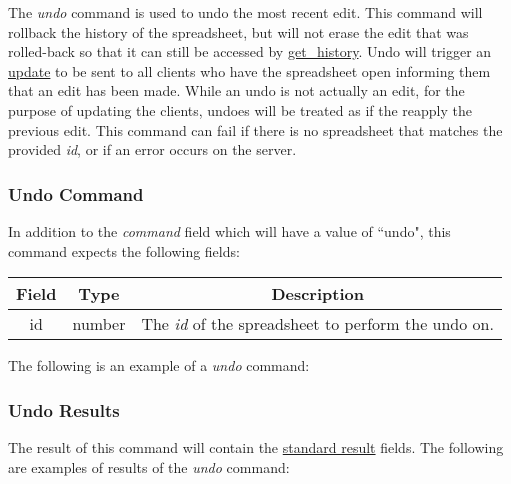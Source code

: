 The \emph{undo} command is used to undo the most recent edit. This command 
will rollback the history of the spreadsheet, but will not erase the edit 
that was rolled-back so that it can still be accessed by \hyperref[sec:message:get_history]{get\_history}. 
Undo will trigger an \hyperref[lst:update:edits]{update} to be sent to all 
clients who have the spreadsheet open informing them that an edit has been 
made. While an undo is not actually an edit, for the purpose of updating 
the clients, undoes will be treated as if the reapply the previous edit. 
This command can fail if there is no spreadsheet that matches the provided \emph{id}, 
or if an error occurs on the server.

\subsubsection{Undo Command}
In addition to the \emph{command} field which will have a value of ``undo", this command expects the following fields:
\begin{table}[H]
    \begin{center}
        \begin{tabular}{|c|c|c|}\hline
            Field & Type & Description \\\hline
            id & number & The \emph{id} of the spreadsheet to perform the undo on. \\\hline
        \end{tabular}
    \end{center}
\end{table}

The following is an example of a \emph{undo} command:


\subsubsection{Undo Results}
The result of this command will contain the \hyperref[sec:message:result]{standard result} fields.
The following are examples of results of the \emph{undo} command:



